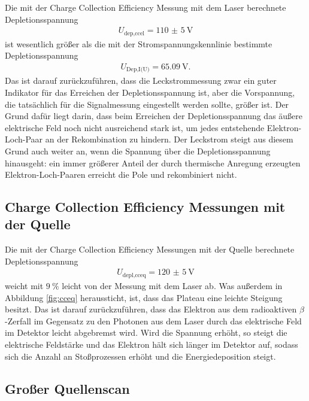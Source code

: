 Die mit der Charge Collection Efficiency Messung mit dem Laser berechnete Depletionsspannung
\begin{align}
  U_\text{dep,ccel} = \SI{110(5)}{\volt}
\end{align}
ist wesentlich größer als die mit der Stromspannungskennlinie bestimmte Depletionsspannung
\begin{align}
  U_\text{Dep,I(U)} = \SI{65.09}{\volt}.
\end{align}
Das ist darauf zurückzuführen, dass die Leckstrommessung zwar ein guter Indikator für das Erreichen der
Depletionsspannung ist, aber die Vorspannung, die tatsächlich für die Signalmessung eingestellt werden sollte,
größer ist. Der Grund dafür liegt darin, dass beim Erreichen der Depletionsspannung das äußere elektrische Feld noch nicht
ausreichend stark ist, um jedes entstehende Elektron-Loch-Paar an der Rekombination zu hindern. Der Leckstrom steigt aus diesem
Grund auch weiter an, wenn die Spannung über die Depletionsspannung hinausgeht: ein immer größerer Anteil der durch
thermische Anregung erzeugten Elektron-Loch-Paaren erreicht die Pole und rekombiniert nicht.

\subsection{Charge Collection Efficiency Messungen mit der Quelle}

Die mit der Charge Collection Efficiency Messungen mit der Quelle berechnete Depletionsspannung
\begin{align}
  U_\text{depl,cceq} = \SI{120(5)}{\volt}
\end{align}
weicht mit $\SI{9}{\percent}$ leicht von der Messung mit dem Laser ab. Was außerdem in Abbildung
\ref{fig:cceq} heraussticht, ist, dass das Plateau eine leichte Steigung besitzt. Das ist darauf zurückzuführen, dass
das Elektron aus dem radioaktiven $\beta$-Zerfall im Gegensatz zu den Photonen aus dem Laser durch das
elektrische Feld im Detektor leicht abgebremst wird. Wird die Spannung erhöht, so steigt die elektrische Feldstärke
und das Elektron hält sich länger im Detektor auf, sodass sich die Anzahl an Stoßprozessen erhöht und die Energiedeposition steigt.

\subsection{Großer Quellenscan}

